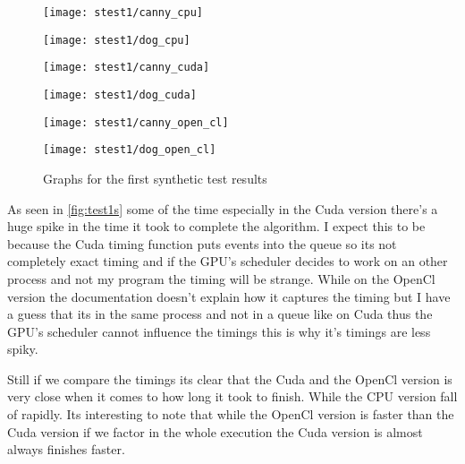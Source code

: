 \begin{figure}[H]
\centering
\begin{minipage}[t]{.49\textwidth}
\centering
\texttt{[image: stest1/canny\_cpu]}
\end{minipage}
\begin{minipage}[t]{.49\textwidth}
\centering
\texttt{[image: stest1/dog\_cpu]}
\end{minipage}
\begin{minipage}[t]{.49\textwidth}
\centering
\texttt{[image: stest1/canny\_cuda]}
\end{minipage}
\begin{minipage}[t]{.49\textwidth}
\centering
\texttt{[image: stest1/dog\_cuda]}
\end{minipage}
\begin{minipage}[t]{.49\textwidth}
\centering
\texttt{[image: stest1/canny\_open\_cl]}
\end{minipage}
\begin{minipage}[t]{.49\textwidth}
\centering
\texttt{[image: stest1/dog\_open\_cl]}
\end{minipage}
\caption{Graphs for the first synthetic test results}
\label{fig:test1s}
\end{figure}

As seen in \autoref{fig:test1s} some of the time especially in the Cuda version there's a huge spike in the time it took to complete the algorithm. I expect this to be because the Cuda timing function puts events into the queue so its not completely exact timing and if the \ac{GPU}'s scheduler decides to work on an other process and not my program the timing will be strange. While on the OpenCl version the documentation doesn't explain how it captures the timing but I have a guess that its in the same process and not in a queue like on Cuda thus the \ac{GPU}'s scheduler cannot influence the timings this is why it's timings are less spiky. 

Still if we compare the timings its clear that the Cuda and the OpenCl version is very close when it comes to how long it took to finish. While the \ac{CPU} version fall of rapidly. Its interesting to note that while the OpenCl version is faster than the Cuda version if we factor in the whole execution the Cuda version is almost always finishes faster.
